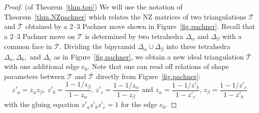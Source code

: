 \documentclass[12pt,reqno]{amsart}
\theoremstyle{definition}
\def\calT{\mathcal T}
\def\be{\begin{equation}}
\def\ee{\end{equation}}
\begin{document}
\begin{proof}(of Theorem~\ref{thm.top})
We will use the notation of Theorem~\ref{thm.NZpachner} which relates the NZ matrices of
two triangulations $\calT$ and $\overline{\calT}$ obtained by a 2--3 Pachner move
shown in Figure~\ref{fig.pachner}. 
Recall that a 2--3 Pachner move on $\calT$ is determined by two tetrahedra
$\Delta_\alpha$ and $\Delta_\beta$ with a common face in $\calT$. Dividing the
bipyramid $\Delta_\alpha \cup \Delta_\beta$ into three tetrahedra $\Delta_a, \Delta_b,$
and $\Delta_c$ as in Figure~\ref{fig.pachner}, we obtain a new ideal triangulation
$\overline{\calT}$ with one additional edge $e_0$.
Note that
one can read off relations of shape parameters between $\calT$ and
$\overline{\calT}$ directly from Figure~\ref{fig.pachner}:
\be
\label{eqn.shapes}
z'_a= z_\alpha z_\beta, \ z'_b=\frac{1-1/z_\beta}{1-z_\alpha},\,
z'_c = \frac{1-1/z_\alpha}{1-z_\beta} \textrm{ and }
z_\alpha = \frac{1-1/z'_b}{1-z'_c}, \,	z_\beta = \frac{1-1/z'_c}{1-z'_b}
\ee
with the gluing equation $z'_a z'_b z'_c=1$ for the edge $e_0$.



\end{proof}
\end{document}
